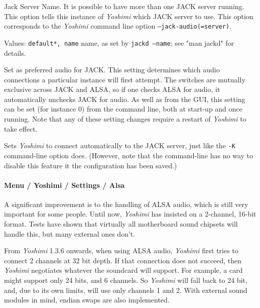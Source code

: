    Jack Server Name.
   It is possible to have more than one JACK server running.  This option
   tells this instance of \textsl{Yoshimi} which JACK server to use.
   This option corresponds to the \textsl{Yoshimi} command line option
   \texttt{--jack-audio(=server)}.

   Values: \texttt{default*, name} name, as set by
   \texttt{jackd --name}; see "man jackd" for details.

   Set as preferred audio for JACK.
   This setting determines which audio connections a particular instance will
   first attempt. The switches are mutually exclusive across JACK and ALSA,
   so if one checks ALSA for audio, it automatically unchecks JACK for audio.
   As well as from the GUI, this setting can be set (for instance 0) from the
   command line, both at start-up and once running.
   Note that any of these setting changes require a restart of \textsl{Yoshimi}
   to take effect.

   Sets \textsl{Yoshimi} to connect automatically to the JACK server, just like
   the \texttt{-K} command-line option does.  (However, note that the
   command-line has no way to disable this feature it the configuration has been
   saved.)

\paragraph{Menu / Yoshimi / Settings / Alsa}
\label{paragraph:menu_yoshimi_settings_alsa_tab}

   A significant improvement is to the handling of ALSA audio, which is still
   very important for some people. Until now, \textsl{Yoshimi} has insisted
   on a 2-channel, 16-bit format. Tests have shown that virtually all
   motherboard sound chipsets will handle this, but many external ones don't.

   From \textsl{Yoshimi} 1.3.6 onwards, when using ALSA audio,
   \textsl{Yoshimi} first tries to connect 2 channels at 32 bit depth.  If
   that connection does not succeed, then \textsl{Yoshimi} negotiates
   whatever the soundcard will support.  For example, a card might support
   only 24 bits, and 6 channels.  So \textsl{Yoshimi} will fall back to
   24 bit, and, due to its own limits, will use only channels 1 and 2.
   With external sound modules in mind, endian swaps are also implemented.

